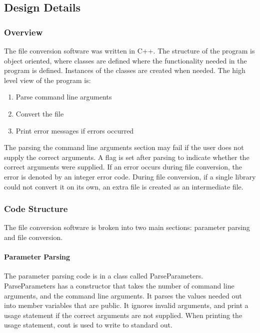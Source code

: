     \subsection{Design Details}

    \subsubsection{Overview}

    The file conversion software was written in C++.  The structure of the program is object oriented, where classes are defined where the functionality needed
    in the program is defined.  Instances of the classes are created when needed.  
    The high level view of the program is:
    \begin{enumerate}
        \item Parse command line arguments
        \item Convert the file
        \item Print error messages if errors occurred
    \end{enumerate}

    The parsing the command line arguments section may fail if the user does not supply the correct arguments.  A flag is set after parsing to indicate
    whether the correct arguments were supplied.  If an error occurs during file conversion, the error is denoted by an integer error code.  
    During file conversion, if a single library could not convert it on its own, an extra file is created as an intermediate file.

    \subsubsection{Code Structure}
    The file conversion software is broken into two main sections: parameter parsing and file conversion.

    \paragraph{Parameter Parsing}
    \hfill \break
    The parameter parsing code is in a class called ParseParameters.  ParseParameters has a constructor that takes the number of command line arguments, 
    and the command line arguments.  It parses the values needed out into member variables that are public.  It ignores invalid arguments,
    and print a usage statement if the correct arguments are not supplied.  When printing the usage statement, cout is used to write to standard out.


